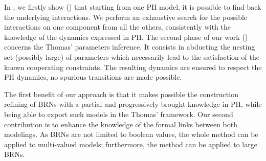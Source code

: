 In \cite{FPIMR12-CMSB}, we firstly show () that starting from one PH model, it is possible to find back the underlying interactions.
We perform an exhaustive search for the possible interactions on one component from all the
others, consistently with the knowledge of the dynamics expressed in PH.
The second phase of our work () concerns the Thomas' parameters inference.
It consists in abducting the nesting set (possibly large) of parameters which necessarily
lead to the satisfaction of the known cooperating constraints.
The resulting dynamics are ensured to respect the PH dynamics, \ie no spurious transitions are
made possible.

The first benefit of our approach is that it makes possible the construction refining of BRNs with a partial and progressively brought knowledge in PH, while being able to export such models in the Thomas' framework.
Our second contribution is to enhance the knowledge of the formal links between both modelings.
As BRNs are not limited to boolean values, the whole method can be applied to multi-valued models;
furthermore, the method can be applied to large BRNs.

\begin{comment}
\paragraph{Outline.}
\pref{sec:frameworks} recalls the PH and Thomas frameworks;
\pref{sec:infer-IG} defines the IG inference from PH;
\pref{sec:infer-K} details the enumeration of Thomas parametrizations compatible with a PH;
\pref{sec:examples} gives some information about the implementation of the method.
\end{comment}
